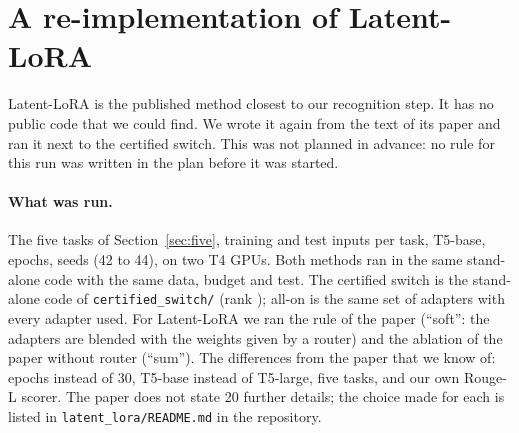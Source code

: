\FloatBarrier
\section{A re-implementation of Latent-LoRA}
\label{app:latent}

Latent-LoRA \citep{latentlora2026} is the published method closest to our recognition step. It has no
public code that we could find. We wrote it again from the text of its paper and ran it next to the
certified switch. This was not planned in advance: no rule for this run was written in the plan
before it was started.

\paragraph{What was run.} The five tasks of Section~\ref{sec:five}, \LatentTrainInputs{} training and
\LatentTestInputs{} test inputs per task, T5-base, \LatentEpochs{} epochs, \LatentSeeds{} seeds (42 to 44), on two T4 GPUs.
Both methods ran in the same stand-alone code with the same data, budget and test. The certified switch
is the stand-alone code of \texttt{certified\_switch/} (rank \LatentRank{}); all-on is the same set of
adapters with every adapter used. For Latent-LoRA we ran the rule of the paper (``soft'': the
adapters are blended with the weights given by a router) and the ablation of the paper without router
(``sum''). The differences from the paper that we know of: \LatentEpochs{} epochs instead of 30, T5-base
instead of T5-large, five tasks, and our own Rouge-L scorer. The paper does not state 20 further details;
the choice made for each is listed in \texttt{latent\_lora/README.md} in the repository.

\begin{table}[h]
  \caption{Original instructions, mean over \LatentSeeds{} seeds. Answers changed: answers to old inputs that
  differ from those given right after learning. The sum rule and all-on use no router. Rows 3 and 4 are
  our re-implementation from the paper.}
  \label{tab:latentmain}
  \centering
  \small
  
\end{table}

\begin{table}[h]
  \caption{The four wordings of the task instructions (Appendix~\ref{app:rewordings}), mean over \LatentSeeds{} seeds. Answers changed: of \LatentCompared{} answers. Right: share of test inputs given to their own task (for the soft rule: the adapter with the largest router weight).}
  \label{tab:latentwordings}
  \centering
  \small
  
\end{table}

